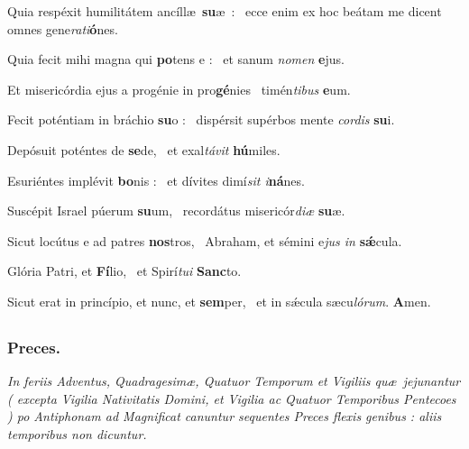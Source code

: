 \documentclass[12pt]{article} %
\def\noinitial{%
\gresetfirstlineaboveinitial{\textcolor{benred8}{\small \textsc{\textbf{}}}}{\textcolor{benred8}{\small \textsc{\textbf{}}}}
\setspaceafterinitial{0pt plus 0em minus 0em}%
\setspacebeforeinitial{0pt plus 0em minus 0em}%
\relax %
}
\newenvironment{psalmtext}{\leftskip 0.25in}{\vspace{2 mm}}
\newenvironment{rubric}{\vspace{2 mm}\color{benred8} \itshape \leftskip 0in \setlength{\parindent}{0.25in}}{\vspace{2 mm}}
\let\oldgresixstar\gresixstar
\renewcommand{\gresixstar}{\textcolor{benred8}{\oldgresixstar}}
\begin{document}
\begin{psalmtext}
Quia resp\'{e}xit humilit\'{a}tem anc\'{i}ll\ae\ \textbf{su}\ae\ : \gresixstar\ ecce enim ex hoc be\'{a}tam me dicent omnes gene\emph{rati}\textbf{\'{o}}nes.

Quia fecit mihi magna qui \textbf{po}tens e : \gresixstar\ et sanum \emph{nomen} \textbf{e}jus.

Et miseric\'{o}rdia ejus a prog\'{e}nie in pro\textbf{g\'{e}}nies \gresixstar\ tim\'{e}n\emph{tibus} \textbf{e}um.

Fecit pot\'{e}ntiam in br\'{a}chio \textbf{su}o : \gresixstar\ disp\'{e}rsit sup\'{e}rbos mente \emph{cordis} \textbf{su}i.

Dep\'{o}suit pot\'{e}ntes de \textbf{se}de, \gresixstar\ et exal\emph{t\'{a}vit} \textbf{h\'{u}}miles.

Esuri\'{e}ntes impl\'{e}vit \textbf{bo}nis : \gresixstar\ et d\'{i}vites dim\'{i}\emph{sit i}\textbf{n\'{a}}nes.

Susc\'{e}pit Israel p\'{u}erum \textbf{su}um, \gresixstar\ record\'{a}tus miseric\'{o}r\emph{di\ae} \textbf{su}\ae.

Sicut loc\'{u}tus e ad patres \textbf{nos}tros, \gresixstar\ Abraham, et s\'{e}mini e\emph{jus in} \textbf{s\'{\ae}}cula.

Glória Patri, et \textbf{Fí}lio, \gresixstar\ et Spirí\emph{tui} \textbf{Sanc}to.

Sicut erat in princípio, et nunc, et \textbf{sem}per, \gresixstar\ et in sǽcula sæcu\emph{lórum}. \textbf{A}men.

\end{psalmtext}

{\noinitial
{}

}


\subsection*{}

\subsubsection*{Preces.}

\begin{rubric}
In feriis Adventus, Quadragesim\ae , Quatuor Temporum et Vigiliis qu\ae\ jejunantur ( excepta Vigilia Nativitatis Domini, et Vigilia ac Quatuor Temporibus Pentecoes ) po Antiphonam ad Magnificat canuntur sequentes Preces flexis genibus : aliis temporibus non dicuntur.

\end{rubric}
\end{document}

